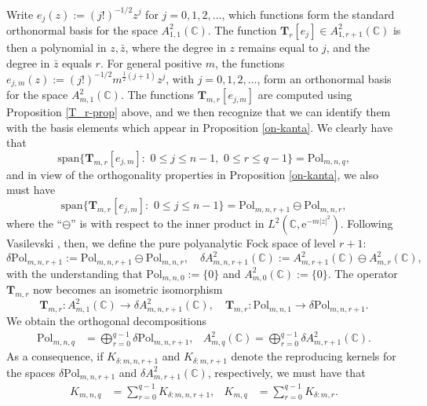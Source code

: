 \documentclass{birkart}
\theoremstyle{definition}
\theoremstyle{remark}
\numberwithin{equation}{section}
\numberwithin{figure}{section}
\newcommand{\e}{\mathrm e}
\newcommand{\1}{{\mathbf 1}}
\newcommand{\Rpar}{q}
\newcommand{\C}{{\mathbb C}}
\newcommand{\Tope}{{\mathbf T}}
\newcommand{\Fspace}{{\delta\mathrm{Pol}}}
\begin{document}
Write $e_j(z):=(j!)^{-1/2}z^j$ for $j=0,1,2,\ldots$, which 
functions form the standard orthonormal basis for the space $A^2_{1,1}(\C)$.
The function $\Tope_r[e_j]\in A^2_{1,r+1}(\C)$ is then a polynomial in 
$z,\bar z$, where the degree in $z$ remains equal to $j$, and the degree in 
$\bar z$ equals $r$. For general positive $m$, the functions $e_{j,m}(z):=
(j!)^{-1/2}m^{\frac12(j+1)}z^j$, with $j=0,1,2,\ldots$, form an orthonormal
basis for the space $A^2_{m,1}(\C)$. The functions $\Tope_{m,r}[e_{j,m}]$
are computed using Proposition \ref{T_r-prop} above, and we then recognize
that we can identify them with the basis elements which appear in
Proposition \ref{on-kanta}. We clearly have that
\[
\mathrm{span}\big\{\Tope_{m,r}[e_{j,m}]:\,\, 0\le j\le n-1,\,\,0\le r\le q-1
\big\}=\mathrm{Pol}_{m,n,q},
\]
and in view of the orthogonality properties in Proposition \ref{on-kanta}, 
we also must have
\begin{equation}
\mathrm{span}\{\Tope_{m,r}[e_{j,m}]:\,\, 0\le j\le n-1\}
=\mathrm{Pol}_{m,n,r+1}\ominus \mathrm{Pol}_{m,n,r},
\label{eq-resspace1}
\end{equation}
where the ``$\ominus$'' is with respect to the inner product in 
$L^2(\C,\e^{-m|z|^2})$.
Following Vasilevski \cite{vas}, then, we define the pure polyanalytic Fock 
space of level $r+1$:
\begin{equation}
\Fspace_{m,n,r+1}:=\mathrm{Pol}_{m,n,r+1}\ominus \mathrm{Pol}_{m,n,r},\quad
\delta A^2_{m,n,r+1}(\C):=A^2_{m,r+1}(\C)\ominus A^2_{m,r}(\C),
\label{eq-resspace2}
\end{equation} 
with the understanding that $\mathrm{Pol}_{m,n,0}:=\{0\}$ and 
$A^2_{m,0}(\C):=\{0\}$. 
The operator $\Tope_{m,r}$ now becomes an isometric isomorphism 
\[
\Tope_{m,r}:A^2_{m,1}(\C)\to\delta A^2_{m,n,r+1}(\C),\quad
\Tope_{m,r}:\mathrm{Pol}_{m,n,1}\to\Fspace_{m,n,r+1}.
\]
We obtain the orthogonal decompositions
\begin{align*} 
\mathrm{Pol}_{m,n,\Rpar} &= \bigoplus_{r=0}^{\Rpar-1} \Fspace_{m,n,r+1},
& A^2_{m,\Rpar}(\C)=\bigoplus_{r=0}^{\Rpar-1} \delta A^2_{m,r+1}(\C).
\end{align*}
As a consequence, if $K_{\delta:m,n,r+1}$ and $K_{\delta:m,r+1}$ 
denote the reproducing kernels for the spaces $\Fspace_{m,n,r+1}$ and
$\delta A^2_{m,r+1}(\C)$, respectively, we must have that
\begin{align} 
\label{kernelsubspacedecomposition}
K_{m,n,\Rpar} &= \sum_{r=0}^{\Rpar-1} K_{\delta:{m,n,r+1}},
&  K_{m,\Rpar} &=\sum_{r=0}^{\Rpar-1} K_{\delta:{m,r}}.
\end{align}
\medskip
\end{document}
